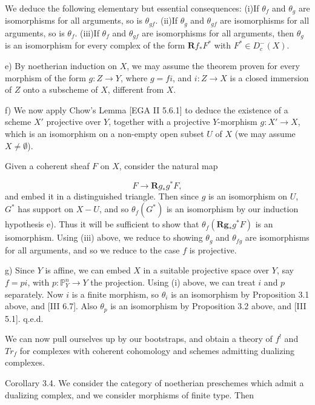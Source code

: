 \documentclass[12pt]{book}
\begin{document}
\setcounter{page}{381}
We deduce the following elementary but essential consequences:
(i)If \(\theta_{f}\) and \(\theta_{g}\) are isomorphisms for all arguments, so is \(\theta_{gf}\).
(ii)If \(\theta_{g}\) and \(\theta_{gf}\) are isomorphisms for all arguments, so is \(\theta_{f}\).
(iii)If \(\theta_{f}\) and \(\theta_{gf}\) are isomorphisms for all arguments, then \(\theta_{g}\) is an isomorphism for every complex of the form \(\mathbf{R} f_{*} F^{*}\) with \(F^{*} \in D_{c}^{-}(X)\).

e) By noetherian induction on \(X\), we may assume the theorem proven for every morphism of the form \(g: Z \to Y\), where \(g=fi\), and \(i: Z \to X\) is a closed immersion of \(Z\) onto a subscheme of \(X\), different from \(X\).

f) We now apply Chow's Lemma [EGA II 5.6.1] to deduce the existence of a scheme \(X'\) projective over \(Y\), together with a projective \(Y\)-morphism \(g: X' \to X\), which is an isomorphism on a non-empty open subset \(U\) of \(X\) (we may assume \(X \ne \emptyset\)).

Given a coherent sheaf \(F\) on \(X\), consider the natural map

\setcounter{page}{382}
\[F \to \mathbf{R}g_{*} g^{*} F,\]
and embed it in a distinguished triangle.
Then since \(g\) is an isomorphism on \(U\), \(G^{*}\) has support on \(X-U\), and so \(\theta_{f}(G^{*})\) is an isomorphism by our induction hypothesis e).
Thus it will be sufficient to show that \(\theta_{f}(\mathbf{R g}_{*} g^{*} F)\) is an isomorphism.
Using (iii) above, we reduce to showing \(\theta_{g}\) and \(\theta_{fg}\) are isomorphisms for all arguments, and so we reduce to the case \(f\) is projective.

g) Since \(Y\) is affine, we can embed \(X\) in a suitable projective space over \(Y\), say \(f=pi\), with
\(p: \mathbb{P}_{Y}^{n} \to Y\) the projection.
Using (i) above, we can treat \(i\) and \(p\) separately.
Now \(i\) is a finite morphism, so \(\theta_{i}\) is an isomorphism by Proposition 3.1 above, and [III 6.7].
Also \(\theta_{p}\) is an isomorphism by Proposition 3.2 above, and [III 5.1].
q.e.d.

\setcounter{page}{383}
We can now pull ourselves up by our bootstraps, and obtain a theory of \(f^{!}\) and \(Tr_{f}\) for complexes with coherent cohomology and schemes admitting dualizing complexes.

Corollary 3.4. We consider the category of noetherian preschemes which admit a dualizing complex, and we consider morphisms of finite type. Then
\end{document}
